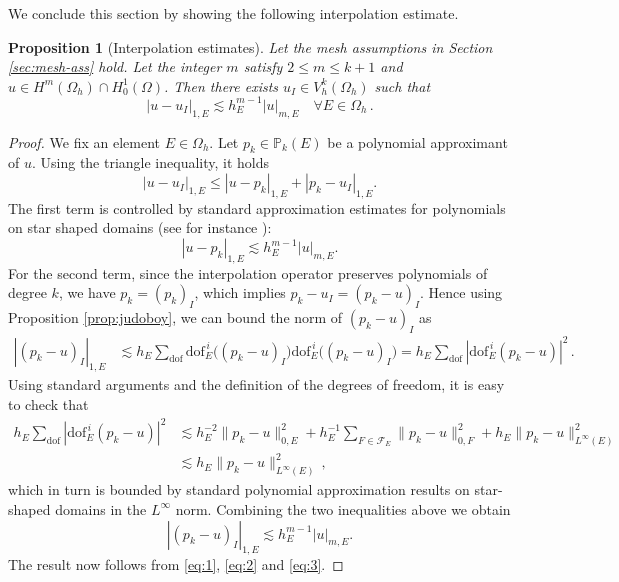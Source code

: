\documentclass[a4paper,11pt]{article}
\newtheorem{proposition}[theorem]{Proposition}
\theoremstyle{remark}
\theoremstyle{definition}
\newcommand{\Pol}{\mathbb{P}}
\begin{document}
We conclude this section by showing the following interpolation estimate.
\begin{proposition}[Interpolation estimates]\label{lm:portugal-interpolation}
Let the mesh assumptions in Section \ref{sec:mesh-ass} hold.
Let the integer $m$ satisfy $2 \le m \le k+1$ and $u \in H^{m}(\Omega_h) \cap H_0^1(\Omega)$. 
Then there exists $u_I \in V_h^k(\Omega_h)$ such that
\[
| u - u_I |_{1,E} \lesssim h_E^{m-1} | u |_{m,E} \quad \forall E \in \Omega_h \, .
\]
\end{proposition}
\begin{proof}
We fix an element $E \in \Omega_h$. Let $p_k \in \Pol_k(E)$ be a polynomial approximant of $u$. Using the triangle inequality, it holds
\begin{equation}\label{eq:1}
| u - u_I |_{1,E} \leq | u - p_k |_{1,E} + | p_k - u_I |_{1,E}.
\end{equation}
The first term is controlled by standard approximation estimates for polynomials on star shaped domains (see for instance \cite{dupont-scott}):
\begin{equation}\label{eq:2}
| u - p_k |_{1,E} \lesssim  h_E^{m-1} | u |_{m,E}.
\end{equation}
For the second term, since the interpolation operator preserves polynomials of degree $k$, we have $p_k = (p_k)_I$, which implies $p_k - u_I = (p_k - u)_I$. Hence using Proposition \ref{prop:judoboy}, we can bound  the norm of $(p_k - u)_I$ as
\[
\begin{aligned}
|(p_k - u)_I|_{1,E}
&\lesssim
h_E \sum_{\text{dof}} \text{dof}^{\,i}_E((p_k - u)_I \bigr) \text{dof}^{\,i}_E\bigl((p_k - u)_I \bigr) 
= h_E \sum_{\text{dof}} | \text{dof}^{\,i}_E( p_k - u ) |^2
\, . 
\end{aligned}
\]
Using standard arguments and the definition of the degrees of freedom, it is easy to check that 
$$
\begin{aligned}
h_E \sum_{\text{dof}} | \text{dof}^{\,i}_E(p_k - u) |^2 
& \lesssim h_E^{-2} \| p_k - u \|_{0,E}^2 + h_E^{-1} \sum_{F \in \mathcal{F}_E} \| p_k - u \|_{0,F}^2
+ h_E \| p_k - u \|_{L^\infty(E)}^2 \\
& \lesssim h_E \| p_k - u \|_{L^\infty(E)}^2 \, ,
\end{aligned}
$$
which in turn is bounded by standard polynomial approximation results on star-shaped domains in the $L^\infty$ norm. 
Combining the two inequalities above we obtain  
\begin{equation}\label{eq:3}
|(p_k - u)_I|_{1,E} \lesssim h_E^{m-1} | u |_{m,E}.
\end{equation}
The result now follows from \eqref{eq:1}, \eqref{eq:2} and \eqref{eq:3}.
\end{proof}
\end{document}
